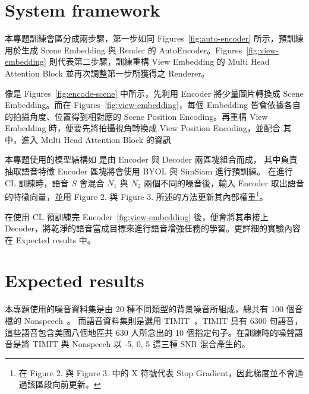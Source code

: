 \documentclass[10pt,twocolumn,letterpaper]{article}
\begin{document}
\begin{CJK}{UTF8}{bkai}
   \section{System framework}
   本專題訓練會區分成兩步驟，第一步如同 Figures~\ref{fig:auto-encoder}
   所示，預訓練用於生成 Scene Embedding 與 Render 的
   AutoEncoder。Figures~\ref{fig:view-embedding} 則代表第二步驟，訓練重構
   View Embedding 的 Multi Head Attention Block
   並再次調整第一步所獲得之 Renderer。

   像是 Figures~\ref{fig:encode-scene} 中所示，先利用 Encoder 將少量圖片轉換成 Scene
   Embedding。而在 Figures~\ref{fig:view-embedding}，每個 Embedding 皆會依據各自的拍攝角度、位置得到相對應的
   Scene Position Encoding。再重構 View Embedding 時，便要先將拍攝視角轉換成 View Position
   Encoding，並配合
   其中，進入 Multi Head Attention Block 的資訊

   本專題使用的模型結構如 是由 Encoder 與 Decoder 兩區塊組合而成，
   其中負責抽取語音特徵 Encoder 區塊將會使用 BYOL 與 SimSiam 進行預訓練。
   在進行 CL 訓練時，語音 $S$ 會混合 $N_1$ 與 $N_2$ 兩個不同的噪音後，輸入 Encoder
   取出語音的特徵向量，並用 Figure 2. 與 Figure 3. 所述的方法更新其內部權重\footnote{
      在 Figure 2. 與 Figure 3. 中的 X 符號代表 Stop Gradient，因此梯度並不會通過該區段向前更新。}。

   在使用 CL 預訓練完 Encoder~\ref{fig:view-embedding} 後，便會將其串接上
   Decoder，將乾淨的語音當成目標來進行語音增強任務的學習。更詳細的實驗內容在 Expected results 中。


   \section{Expected results}
   本專題使用的噪音資料集是由 20 種不同類型的背景噪音所組成，總共有 100 個音檔的 Nonspeech~\cite{mildenhall2020nerf}。
   而語音資料集則是選用 TIMIT~\cite{mildenhall2020nerf}，TIMIT 具有 6300 句語音，這些語音包含美國八個地區共 630 人所念出的 10
   個指定句子。在訓練時的噪聲語音是將 TIMIT 與 Nonspeech 以 -5, 0, 5 這三種 SNR 混合產生的。




\end{CJK}
\end{document}
